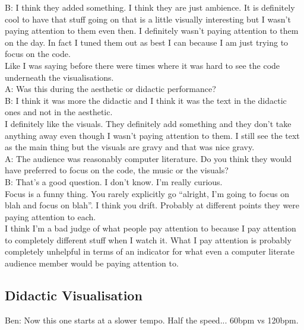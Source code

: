 \documentclass[12pt]{article}
\begin{document}
B: I think they added something. I think they are just ambience. It is definitely cool to have that stuff going on that is a little visually interesting but I wasn't paying attention to them even then. I definitely wasn't paying attention to them on the day. In fact I tuned them out as best I can because I am just trying to focus on the code.\\

Like I was saying before there were times where it was hard to see the code underneath the visualisations.\\

A: Was this during the aesthetic or didactic performance?\\

B: I think it was more the didactic and I think it was the text in the didactic ones and not in the aesthetic.\\

I definitely like the visuals. They definitely add something and they don't take anything away even though I wasn't paying attention to them. I still see the text as the main thing but the visuals are gravy and that was nice gravy.\\

A: The audience was reasonably computer literature. Do you think they would have preferred to focus on the code, the music or the visuals?\\

B: That's a good question. I don't know. I'm really curious.\\

Focus is a funny thing. You rarely explicitly go ``alright, I'm going to focus on blah and focus on blah''. I think you drift. Probably at different points they were paying attention to each.\\

I think I'm a bad judge of what people pay attention to because I pay attention to completely different stuff when I watch it. What I pay attention is probably completely unhelpful in terms of an indicator for what even a computer literate audience member would be paying attention to.\\

\subsection*{Didactic Visualisation}

Ben: Now this one starts at a slower tempo. Half the speed... 60bpm vs 120bpm.\\
\end{document}
